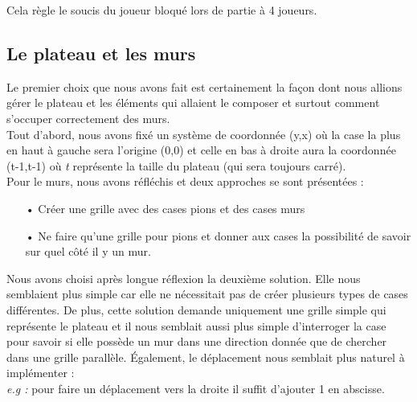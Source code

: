\documentclass[a4paper, 12pt]{article}
\begin{document}
Cela règle le soucis du joueur bloqué lors de partie  à 4 joueurs. 


\subsection{Le plateau et les murs}
Le premier choix que nous avons fait est certainement la façon dont nous allions gérer le plateau et les éléments qui allaient le composer et surtout comment s'occuper correctement
des murs. \\

Tout d'abord, nous avons fixé un système de coordonnée (y,x) où la case la plus en haut à gauche sera l'origine (0,0) et celle en bas à droite aura la coordonnée (t-1,t-1) où \textit{t} représente la taille du plateau (qui sera toujours carré). \\

Pour le murs, nous avons réfléchis et deux approches se sont présentées : 
\begin{itemize}
\item[•] Créer une grille avec des cases pions et des cases murs
\item[•] Ne faire qu'une grille pour pions et donner aux cases la possibilité de savoir sur quel côté il y un mur.
\end{itemize}
Nous avons choisi après longue réflexion la deuxième solution. Elle nous semblaient plus simple car elle ne nécessitait pas de créer plusieurs types de cases différentes. De plus, cette solution demande uniquement une grille simple qui représente le plateau et il nous semblait aussi plus simple d'interroger la case pour savoir si elle possède un mur dans une direction donnée que de chercher dans une grille parallèle. Également, le déplacement nous semblait plus naturel à implémenter : \\
\textit{e.g :} pour faire un déplacement vers la droite il suffit d'ajouter 1 en abscisse. \\
\end{document}
